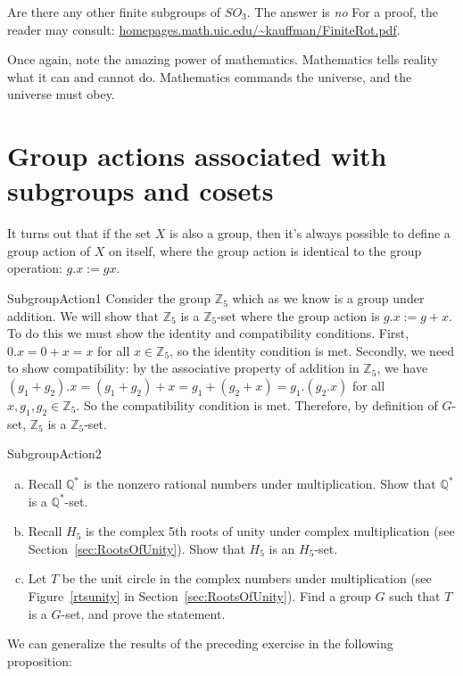 Are there any other finite subgroups of $SO_3$.  The answer is \emph{no} For a proof, the reader may consult: \url{homepages.math.uic.edu/~kauffman/FiniteRot.pdf}.

Once again, note the amazing power of mathematics. Mathematics tells reality what it can and cannot do. Mathematics commands the universe, and the universe must obey. 


\section{Group actions associated with subgroups and cosets}\label{SubgroupsAndCosets}
It turns out that if the set $X$ is also a group, then it's always possible to define a group action of $X$ on itself, where the group action is identical to the group operation: $g.x:=gx$.

\begin{example}{SubgroupAction1}
Consider the group $\mathbb{Z}_5$ which as we know is a group under addition. We will show that $\mathbb{Z}_5$ is a $\mathbb{Z}_5$-set where the group action is $g.x := g+x$. To do this we must show the identity and compatibility conditions. First, $0.x = 0+x = x$ for all $x \in\mathbb {Z}_5$, so the identity condition is met.  Secondly, we need to show compatibility: by the associative property of addition in $\mathbb {Z}_5$, we have $(g_1+g_2).x = (g_1+g_2)+x  = g_1+(g_2+x) = g_1.(g_2.x)$ for all $x, g_1,g_2 \in\mathbb{ Z}_5$. So the compatibility condition is met.  Therefore, by definition of $G$-set, $\mathbb{Z}_5$ is a $\mathbb{Z}_5$-set.
\end {example}

\begin{exercise}{SubgroupAction2}
\begin{enumerate} [(a)]
\item Recall $\mathbb{ Q}^* $ is the nonzero rational numbers under multiplication. Show that $\mathbb{ Q}^* $ is a $\mathbb{ Q}^* $-set.
\item Recall $H_5$ is the complex 5th roots of unity under complex multiplication (see Section~\ref{sec:RootsOfUnity}). Show that $H_5$ is an $H_5$-set.
\item Let $T$ be the unit circle in the complex numbers under multiplication (see Figure~\ref{rtsunity} in Section~\ref{sec:RootsOfUnity}).  Find a group $G$ such that $T$ is a $G$-set, and prove the statement.
\end{enumerate}
\end {exercise}
We can generalize the results of the preceding exercise in the following proposition:

